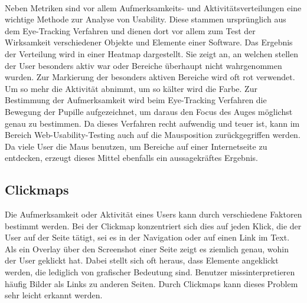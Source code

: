 \\
Neben Metriken sind vor allem Aufmerksamkeits- und Aktivitätsverteilungen eine wichtige Methode zur Analyse von Usability. Diese stammen ursprünglich aus dem Eye-Tracking Verfahren und dienen dort vor allem zum Test der Wirksamkeit verschiedener Objekte und Elemente einer Software. Das Ergebnis der Verteilung wird in einer Heatmap dargestellt. Sie zeigt an, an welchen stellen der User besonders aktiv war oder Bereiche überhaupt nicht wahrgenommen wurden. Zur Markierung der besonders aktiven Bereiche wird oft rot verwendet. Um so mehr die Aktivität abnimmt, um so kälter wird die Farbe. Zur Bestimmung der Aufmerksamkeit wird beim Eye-Tracking Verfahren die Bewegung der Pupille aufgezeichnet, um daraus den Focus des Auges möglichst genau zu bestimmen. Da dieses Verfahren recht aufwendig und teuer ist, kann im Bereich Web-Usability-Testing auch auf die Mausposition zurückgegriffen werden. Da viele User die Maus benutzen, um Bereiche auf einer Internetseite zu entdecken, erzeugt dieses Mittel ebenfalls ein aussagekräftes Ergebnis.


\subsection{Clickmaps}

Die Aufmerksamkeit oder Aktivität eines Users kann durch verschiedene Faktoren bestimmt werden. Bei der Clickmap konzentriert sich dies auf jeden Klick, die der User auf der Seite tätigt, sei es in der Navigation oder auf einen Link im Text. Als ein Overlay über den Screenshot einer Seite zeigt es ziemlich genau, wohin der User geklickt hat. Dabei stellt sich oft heraus, dass Elemente angeklickt werden, die lediglich von grafischer Bedeutung sind. Benutzer missinterpretieren häufig Bilder als Links zu anderen Seiten. Durch Clickmaps kann dieses Problem sehr leicht erkannt werden.

